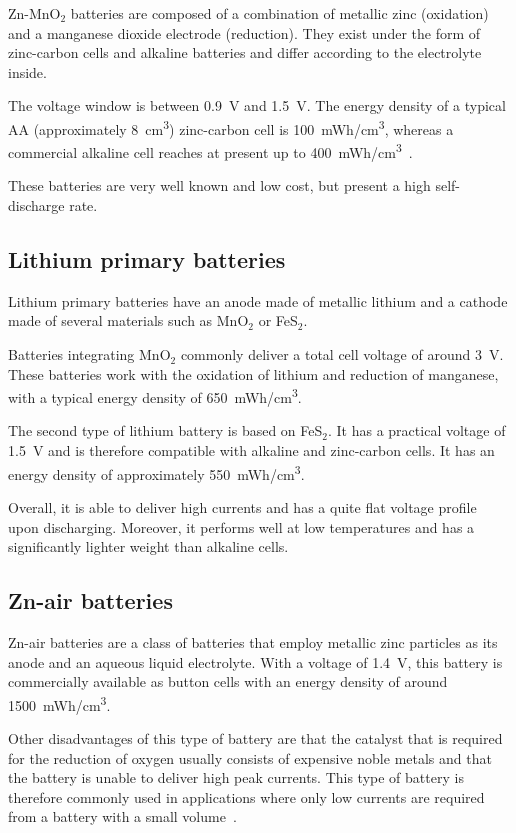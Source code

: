 \documentclass{EPL-master-thesis-covers-EN}
\begin{document}
Zn-MnO${}_2$ batteries are composed of a combination of metallic zinc (oxidation) and a manganese dioxide electrode (reduction). They exist under the form of zinc-carbon cells and alkaline batteries and differ according to the electrolyte inside.

The voltage window is between \SI{0.9}{V} and \SI{1.5}{V}. The energy density of a typical AA (approximately \SI{8}{cm^3}) zinc-carbon cell is \SI{100}{mWh/cm^3}, whereas a commercial alkaline cell reaches at present up to \SI{400}{mWh/cm^3}~\cite{doi:10.1002/er.2949}.

These batteries are very well known and low cost, but present a high self-discharge rate.

\subsection*{Lithium primary batteries}

Lithium primary batteries have an anode made of metallic lithium and a cathode made of several materials such as MnO${}_2$ or FeS${}_2$.

Batteries integrating MnO${}_2$ commonly deliver a total cell voltage of around \SI{3}{V}. These batteries work with the oxidation of lithium and reduction of manganese, with a typical energy density of \SI{650}{mWh/cm^3}.

The second type of lithium battery is based on FeS${}_2$. It has a practical voltage of \SI{1.5}{V} and is therefore compatible with alkaline and zinc-carbon cells. It has an energy density of approximately \SI{550}{mWh/cm^3}.

Overall, it is able to deliver high currents and has a quite flat voltage profile upon discharging. Moreover, it performs well at low temperatures and has a significantly lighter weight than alkaline cells.

\subsection*{Zn-air batteries}

Zn-air batteries are a class of batteries that employ metallic zinc particles as its anode and an aqueous liquid electrolyte. With a voltage of \SI{1.4}{V}, this
battery is commercially available as button cells with an energy density of around \SI{1500}{mWh/cm^3}.

Other disadvantages of this type of battery are that the catalyst that is required for the reduction of oxygen usually consists of expensive noble metals and that the battery is unable to deliver high peak currents. This type of battery is therefore commonly used in applications where only low
currents are required from a battery with a small volume~\cite{doi:10.1002/er.2949}.
\end{document}
